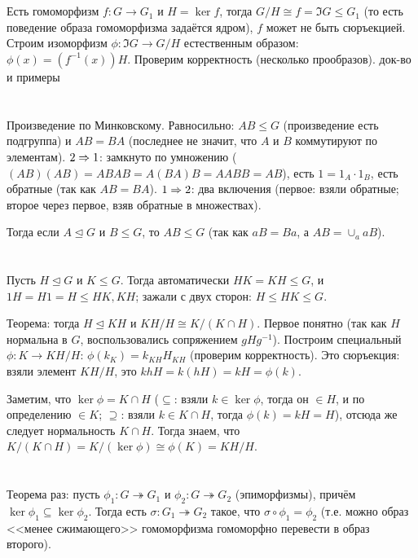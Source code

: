 \section{} %
Есть гомоморфизм $f \colon G \to G_1$ и $H=\ker f$, тогда $G/H \cong f = \Im G \le G_1$
(то есть поведение образа гомоморфизма задаётся ядром), $f$ может не быть сюръекцией.
Строим изоморфизм $\phi \colon \Im G \to G / H$ естественным образом: $\phi(x)=(f^{-1}(x))H$.
Проверим корректность (несколько прообразов).
\TODO док-во и примеры

\section{} %
Произведение по Минковскому.
Равносильно: $AB \le G$ (произведение есть подгруппа) и $AB=BA$ (последнее не значит, что $A$ и $B$ коммутируют по элементам).
$2 \Rightarrow 1$: замкнуто по умножению ($(AB)(AB)=ABAB=A(BA)B=AABB=AB$),
есть $1=1_A\cdot 1_B$, есть обратные (так как $AB=BA$).
$1 \Rightarrow 2$: два включения (первое: взяли обратные; второе через первое, взяв обратные в множествах).

Тогда если $A \unlhd G$ и $B \le G$, то $AB \le G$ (так как $aB=Ba$, а $AB=\cup_a aB$).

\section{} %
Пусть $H \unlhd G$ и $K \le G$.
Тогда автоматически $HK=KH \le G$, и $1H=H1=H\le HK, KH$;
зажали с двух сторон: $H \le HK \le G$.

Теорема: тогда $H \unlhd KH$ и $KH / H \cong K / (K \cap H)$.
Первое понятно (так как $H$ нормальна в $G$, воспользовались сопряжением $gHg^{-1}$).
Построим специальный $\phi \colon K \to KH / H$: $\phi(k_{K})=k_{KH}H_{KH}$ (проверим корректность).
Это сюръекция: взяли элемент $KH/H$, это $khH=k(hH)=kH=\phi(k)$.

Заметим, что $\ker \phi=K \cap H$ ($\subseteq$: взяли $k \in \ker \phi$, тогда
он $\in H$, и по определению $\in K$; $\supseteq$: взяли $k \in K \cap H$,
тогда $\phi(k)=kH=H$), отсюда же следует нормальность $K\cap H$.
Тогда знаем, что $K/(K\cap H) = K/(\ker \phi) \cong \phi(K) = KH / H$.

\section{} %
Теорема раз:
пусть $\phi_1 \colon G \twoheadrightarrow G_1$ и
$\phi_2 \colon G \twoheadrightarrow G_2$ (эпиморфизмы),
причём $\ker \phi_1 \subseteq \ker \phi_2$.
Тогда есть $\sigma \colon G_1 \twoheadrightarrow G_2$ такое, что $\sigma \circ \phi_1 = \phi_2$
(т.е. можно образ <<менее сжимающего>> гомоморфизма гомоморфно перевести в образ второго).

